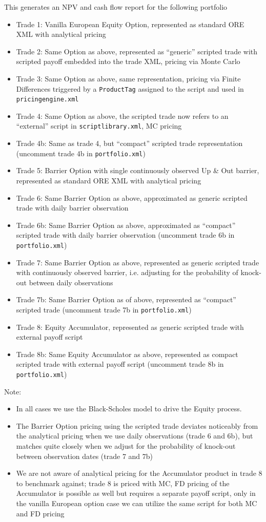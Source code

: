 This generates an NPV and cash flow report for the following portfolio
\begin{itemize}
\item Trade 1: Vanilla European Equity Option, represented as standard ORE XML with analytical pricing
\item Trade 2: Same Option as above, represented as ``generic'' scripted trade with scripted payoff embedded into the trade XML,
  pricing via Monte Carlo
\item Trade 3: Same Option as above, same representation, pricing via Finite Differences triggered by a {\tt ProductTag} assigned
  to the script and used in {\tt pricingengine.xml}
\item Trade 4: Same Option as above, the scripted trade now refers to an ``external'' script in {\tt scriptlibrary.xml},
  MC pricing
\item Trade 4b: Same as trade 4, but ``compact'' scripted trade representation (uncomment trade 4b in {\tt portfolio.xml})
\item Trade 5: Barrier Option with single continuously observed Up \& Out barrier, represented as standard ORE XML with
  analytical pricing
\item Trade 6: Same Barrier Option as above, approximated as generic scripted trade with daily barrier observation
\item Trade 6b: Same Barrier Option as above, approximated as ``compact'' scripted trade with daily barrier observation
  (uncomment trade 6b in {\tt portfolio.xml})
\item Trade 7: Same Barrier Option as above, represented as generic scripted trade with continuously observed barrier,
  i.e. adjusting for the probability of knock-out between daily observations
\item Trade 7b: Same Barrier Option as of above, represented as ``compact'' scripted trade
  (uncomment trade 7b in {\tt portfolio.xml})
\item Trade 8: Equity Accumulator, represented as generic scripted trade with external payoff script
\item Trade 8b: Same Equity Accumulator as above, represented as compact scripted trade with external payoff script
  (uncomment trade 8b in {\tt portfolio.xml})
\end{itemize}

Note:
\begin{itemize}
\item In all cases we use the Black-Scholes model to drive the Equity process.
\item The Barrier Option pricing using the scripted trade deviates noticeably from the analytical pricing when we use daily
  observations (trade 6 and 6b), but matches quite closely when we adjust for the probability of knock-out between observation
  dates (trade 7 and 7b)
\item We are not aware of analytical pricing for the Accumulator product in trade 8 to benchmark against; trade 8 is priced with MC,
  FD pricing of the Accumulator is possible as well but requires a separate payoff script, only in the vanilla European option case
  we can utilize the same script for both MC and FD pricing
\end{itemize}

